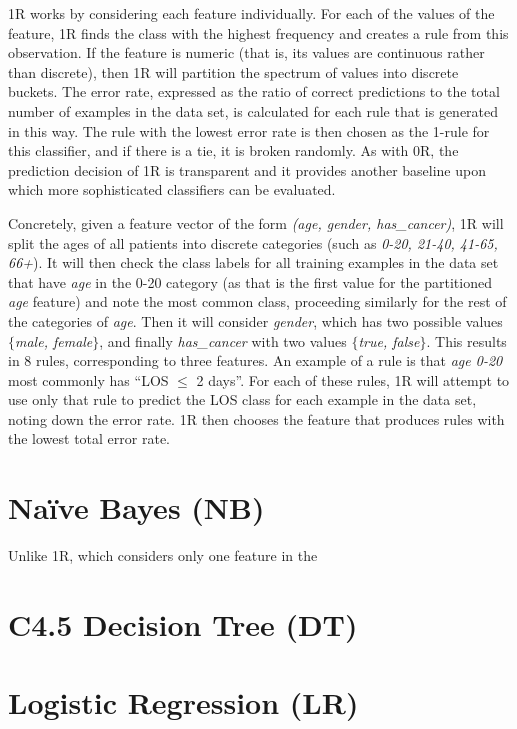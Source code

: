 1R works by considering each feature individually.
For each of the values of the
feature, 1R finds the class with the highest frequency and creates a rule
from this observation. If the feature is numeric (that is, its values are
continuous rather than discrete), then 1R will partition the spectrum of
values into discrete buckets. 
The error rate, expressed as the ratio of correct predictions to the total
number of examples in the data set,
is calculated for each rule that is generated
in this way. The rule with the lowest error rate is then chosen as the 1-rule
for this classifier,
and if there is a tie, it is broken randomly. As with 0R, the prediction
decision of 1R is transparent and it provides another baseline upon which
more sophisticated classifiers can be evaluated.

Concretely, given a feature
vector of the form \textit{(age, gender, has\_cancer)},
1R will split the ages of
all patients into discrete categories
(such as \textit{0-20, 21-40, 41-65, 66+}). It
will then check the class labels for all training examples in the data set
that have \textit{age} in the 0-20 category
(as that is the first value for the partitioned \textit{age} feature) and
note the most common class, proceeding similarly for the rest of the
categories of \textit{age}. Then it will consider \textit{gender}, which has
two possible values $\{$\textit{male, female}$\}$, and finally \textit{has\_cancer}
with two values $\{$\textit{true, false}$\}$. This results in 8 rules,
corresponding to three features.
An example of a rule is that \textit{age 0-20} most commonly
has ``LOS $\leq$ 2 days''. For each of these rules, 1R will attempt to
use only that rule to predict the LOS class for each example in the data set,
noting down the error rate. 1R then chooses the feature that produces rules
with the lowest total error rate. 

\section{Na\"{i}ve Bayes (NB)}
Unlike 1R, which considers only one feature in the 

\section{C4.5 Decision Tree (DT)}

\section{Logistic Regression (LR)}

